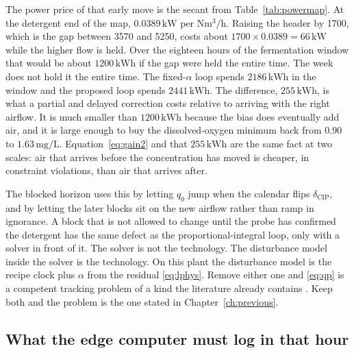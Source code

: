 The power price of that early move is the secant from Table~\ref{tab:powermap}. At the detergent end of the map, $0.0389\,\mathrm{kW}$ per $\mathrm{Nm^{3}/h}$. Raising the header by \SI{1700}{\nmcph}, which is the gap between \SI{3570}{\nmcph} and \SI{5250}{\nmcph}, costs about $1700\times 0.0389=66\,\mathrm{kW}$ while the higher flow is held. Over the eighteen hours of the fermentation window that would be about $1200\,\mathrm{kWh}$ if the gap were held the entire time. The week does not hold it the entire time. The fixed-$\alpha$ loop spends $2186\,\mathrm{kWh}$ in the window and the proposed loop spends $2441\,\mathrm{kWh}$. The difference, $255\,\mathrm{kWh}$, is what a partial and delayed correction costs relative to arriving with the right airflow. It is much smaller than $1200\,\mathrm{kWh}$ because the bias does eventually add air, and it is large enough to buy the dissolved-oxygen minimum back from $0.90$ to $1.63\,\mathrm{mg/L}$. Equation~\eqref{eq:gain2} and that $255\,\mathrm{kWh}$ are the same fact at two scales: air that arrives before the concentration has moved is cheaper, in constraint violations, than air that arrives after.

The blocked horizon uses this by letting $q_{0}$ jump when the calendar flips $\delta_{\mathrm{CIP}}$, and by letting the later blocks sit on the new airflow rather than ramp in ignorance. A block that is not allowed to change until the probe has confirmed the detergent has the same defect as the proportional-integral loop, only with a solver in front of it. The solver is not the technology. The disturbance model inside the solver is the technology. On this plant the disturbance model is the recipe clock plus $\alpha$ from the residual \eqref{eq:lphys}. Remove either one and \eqref{eq:qp} is a competent tracking problem of a kind the literature already contains \cite{holenda2008,shen2008,zeng2015empc,cristea2011}. Keep both and the problem is the one stated in Chapter~\ref{ch:previous}.

\subsection{What the edge computer must log in that hour}

